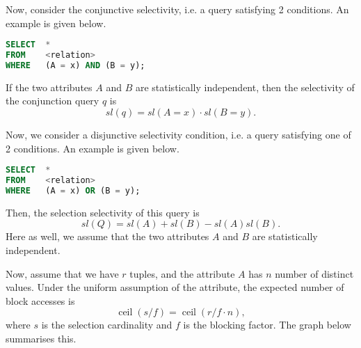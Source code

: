 \documentclass[a4paper, openany]{memoir}
\theoremstyle{definition}
\theoremstyle{plain}
\begin{document}
Now, consider the conjunctive selectivity, i.e. a query satisfying 2 conditions. An example is given below.
\begin{lstlisting}[language=SQL]
SELECT  *
FROM    <relation>
WHERE   (A = x) AND (B = y);
\end{lstlisting}
If the two attributes $A$ and $B$ are statistically independent, then the selectivity of the conjunction query $q$ is
\[\textit{sl}(q) = \textit{sl}(A = x) \cdot \textit{sl}(B = y).\]

Now, we consider a disjunctive selectivity condition, i.e. a query satisfying one of 2 conditions. An example is given below.
\begin{lstlisting}[language=SQL]
SELECT  *
FROM    <relation>
WHERE   (A = x) OR (B = y);
\end{lstlisting}
Then, the selection selectivity of this query is
\[\textit{sl}(Q) = \textit{sl}(A) + \textit{sl}(B) - \textit{sl}(A) \textit{sl}(B).\]
Here as well, we assume that the two attributes $A$ and $B$ are statistically independent.

Now, assume that we have $r$ tuples, and the attribute $A$ has $n$ number of distinct values. Under the uniform assumption of the attribute, the expected number of block accesses is
\[\operatorname{ceil}(s/f) = \operatorname{ceil}(r/f \cdot n),\]
where $s$ is the selection cardinality and $f$ is the blocking factor. The graph below summarises this.
\end{document}
